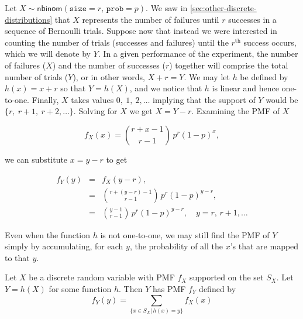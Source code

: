 \documentclass[captions=tableheading]{scrbook}
\begin{document}
\begin{example}
Let \(X\sim\mathsf{nbinom}(\mathtt{size}=r,\,\mathtt{prob}=p)\). We saw in \ref{sec:other-discrete-distributions} that \(X\) represents the number of failures until \(r\) successes in a sequence of Bernoulli trials. Suppose now that instead we were interested in counting the number of trials (successes and failures) until the \(r^{\mathrm{th}}\) success occurs, which we will denote by \(Y\). In a given performance of the experiment, the number of failures (\(X\)) and the number of successes (\(r\)) together will comprise the total number of trials (\(Y\)), or in other words, \(X+r=Y\). We may let \(h\) be defined by \(h(x)=x+r\) so that \(Y=h(X)\), and we notice that \(h\) is linear and hence one-to-one. Finally, \(X\) takes values \(0,\ 1,\ 2,\ldots\) implying that the support of \(Y\) would be \(\{ r,\ r+1,\ r+2,\ldots \}\). Solving for \(X\) we get \(X=Y-r\). Examining the PMF of \(X\)

\begin{equation}
f_{X}(x)={r+x-1 \choose r-1}\, p^{r}(1-p)^{x},
\end{equation}

we can substitute \( x = y - r \) to get

\begin{eqnarray*}
f_{Y}(y) & = & f_{X}(y-r),\\
 & = & {r+(y-r)-1 \choose r-1}\, p^{r}(1-p)^{y-r},\\
 & = & {y-1 \choose r-1}\, p^{r}(1-p)^{y-r},\quad y=r,\, r+1,\ldots
\end{eqnarray*}

\end{example}


Even when the function \(h\) is not one-to-one, we may still find the PMF of \(Y\) simply by accumulating, for each \(y\), the probability of all the \(x\)'s that are mapped to that \(y\).

\begin{prop}
Let \(X\) be a discrete random variable with PMF \(f_{X}\) supported on the set \(S_{X}\). Let \(Y=h(X)\) for some function \(h\). Then \(Y\) has PMF \(f_{Y}\) defined by
\begin{equation}
f_{Y}(y)=\sum_{\{x\in S_{X}|\, h(x)=y\}}f_{X}(x)
\end{equation}
\end{prop}
\end{document}
